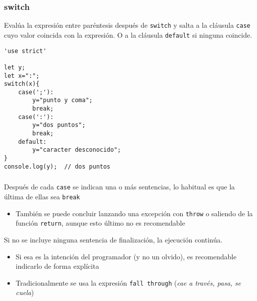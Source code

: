 \documentclass[ucs]{beamer}
\begin{document}
\begin{frame}[fragile]
\frametitle{switch}

Evalúa la expresión entre paréntesis después de
\verb|switch|
y salta a la cláusula
\verb|case|
cuyo valor coincida con la expresión. O a la cláusula
\verb|default|
si ninguna coincide.

  \begin{scriptsize}
  \begin{verbatim}
'use strict'

let y;
let x=":";
switch(x){
    case(';'):
        y="punto y coma";
        break;
    case(':'):
        y="dos puntos";
        break;
    default:
        y="caracter desconocido";
}
console.log(y);  // dos puntos
  \end{verbatim}
  \end{scriptsize}

\end{frame}



\begin{frame}[fragile]
\frametitle{}


Después de cada 
\verb|case|
se indican una o más sentencias,
lo habitual es que la última de ellas sea
\verb|break|


    \begin{itemize}
    \item
También se puede concluir lanzando una excepción con
\verb|throw| o saliendo de la función 
\verb|return|, aunque esto último no es recomendable
    \end{itemize}

Si no se incluye ninguna sentencia de finalización,
la ejecución continúa.

    \begin{itemize}
    \item
Si esa es la intención del programador (y no un olvido), es recomendable
indicarlo de forma explícita
    \item
Tradicionalmente se usa la expresión
\verb|fall through| (\emph{cae a través, pasa, se cuela})
    \end{itemize}

\end{frame}
\end{document}
